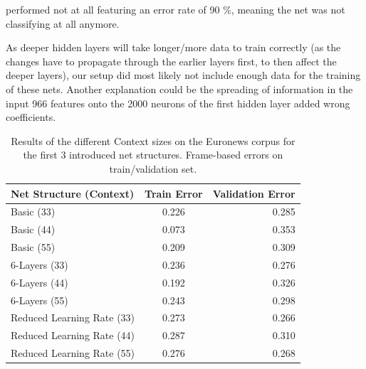 performed not at all featuring an error rate of 90 \%, meaning the net was not classifying at all anymore.  

As deeper hidden layers will take longer/more data to train correctly (as the changes have to propagate through the earlier layers first, to then affect the deeper layers), our setup did most likely not include enough data for the training of these nets. Another explanation could be the spreading of information in the input 966 features onto the 2000 neurons of the first hidden layer added wrong coefficients.

\begin{table}[h!]
\caption{Results of the different Context sizes on the Euronews corpus for the first 3 introduced net structures. Frame-based errors on train/validation set.}
\label{tab:resCtx}
\centering
\begin{tabular}{| l | c | r | }
	\hline
	\textbf{Net Structure (Context)} & \textbf{Train Error} & \textbf{Validation Error}  \\
	\hline
	Basic (33) & 0.226 &  0.285 \\
	\hline
	Basic (44) & 0.073 & 0.353 \\
	\hline
	Basic (55) & 0.209 & 0.309 \\
	\hline
	6-Layers (33) & 0.236 & 0.276 \\
	\hline
	6-Layers (44) & 0.192 & 0.326 \\
	\hline
	6-Layers (55) & 0.243 & 0.298 \\
	\hline
	Reduced Learning Rate (33) & 0.273 & 0.266 \\ 
	\hline
	Reduced Learning Rate (44) & 0.287 & 0.310 \\ 
	\hline
	Reduced Learning Rate (55) & 0.276 & 0.268 \\ 
	\hline
\end{tabular}
\end{table}


